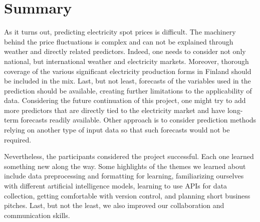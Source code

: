 \documentclass{article}
\numberwithin{equation}{section}
\begin{document}
\section{Summary}
As it turns out, predicting electricity spot prices is difficult. The machinery behind the price fluctuations is complex and can not be explained through weather and directly related predictors. Indeed, one needs to consider not only national, but international weather and electricity markets. Moreover, thorough coverage of the various significant electricity production forms in Finland should be included in the mix. Last, but not least, forecasts of the variables used in the prediction should be available, creating further limitations to the applicability of data. Considering the future continuation of this project, one might try to add more predictors that are directly tied to the electricity market and have long-term forecasts readily available. Other approach is to consider prediction methods relying on another type of input data so that such forecasts would not be required.

Nevertheless, the participants considered the project successful. Each one learned something new along the way. Some highlights of the themes we learned about include data preprocessing and formatting for learning, familiarizing ourselves with different artificial intelligence models, learning to use APIs for data collection, getting comfortable with version control, and planning short business pitches. Last, but not the least, we also improved our collaboration and communication skills.

\end{document}
